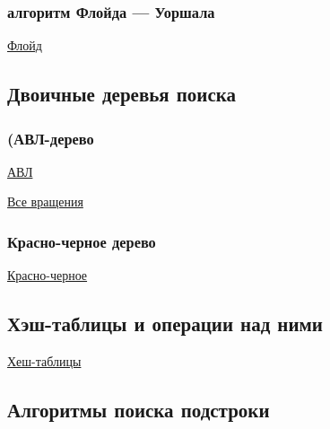 \documentclass{article}
\begin{document}
\subsubsection{алгоритм Флойда — Уоршала}

\href{https://neerc.ifmo.ru/wiki/index.php?title=%D0%90%D0%BB%D0%B3%D0%BE%D1%80%D0%B8%D1%82%D0%BC_%D0%A4%D0%BB%D0%BE%D0%B9%D0%B4%D0%B0#:~:text=%D0%90%D0%BB%D0%B3%D0%BE%D1%80%D0%B8%D1%82%D0%BC%20%D0%A4%D0%BB%D0%BE%D0%B9%D0%B4%D0%B0%20(%D0%B0%D0%BB%D0%B3%D0%BE%D1%80%D0%B8%D1%82%D0%BC%20%D0%A4%D0%BB%D0%BE%D0%B9%D0%B4%D0%B0%E2%80%93%D0%A3%D0%BE%D1%80%D1%88%D0%B5%D0%BB%D0%BB%D0%B0,%D1%85%D0%BE%D1%82%D1%8F%20%D0%B1%D1%8B%20%D0%BE%D0%B4%D0%B8%D0%BD%20%D1%82%D0%B0%D0%BA%D0%BE%D0%B9%20%D1%86%D0%B8%D0%BA%D0%BB}{Флойд}

\subsection{Двоичные деревья поиска}

\subsubsection{(АВЛ-дерево}

\href{https://neerc.ifmo.ru/wiki/index.php?title=%D0%90%D0%92%D0%9B-%D0%B4%D0%B5%D1%80%D0%B5%D0%B2%D0%BE}{АВЛ}

\href{https://ru.wikipedia.org/wiki/%D0%90%D0%92%D0%9B-%D0%B4%D0%B5%D1%80%D0%B5%D0%B2%D0%BE}{Все вращения}

\subsubsection{Красно-черное дерево}

\href{https://neerc.ifmo.ru/wiki/index.php?title=%D0%9A%D1%80%D0%B0%D1%81%D0%BD%D0%BE-%D1%87%D0%B5%D1%80%D0%BD%D0%BE%D0%B5_%D0%B4%D0%B5%D1%80%D0%B5%D0%B2%D0%BE}{Красно-черное}

\subsection{Хэш-таблицы и операции над ними}

\href{https://neerc.ifmo.ru/wiki/index.php?title=%D0%A5%D0%B5%D1%88-%D1%82%D0%B0%D0%B1%D0%BB%D0%B8%D1%86%D0%B0}{Хеш-таблицы}

\subsection{Алгоритмы поиска подстроки}
\end{document}
